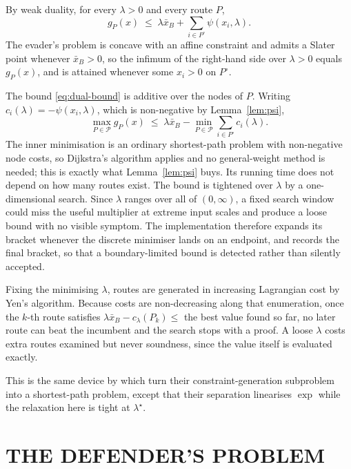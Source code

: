\documentclass[10pt,a4paper,twoside]{article}
\theoremstyle{plain}
\theoremstyle{definition}
\newcommand{\XB}{\bar{x}_B}
\newcommand{\Path}{\mathcal{P}}
\begin{document}
By weak duality, for every $\lambda>0$ and every route $P$,
\begin{equation}
  g_P(x)\;\le\;\lambda\XB+\sum_{i\in P^{\circ}}\psi(x_i,\lambda).
  \label{eq:dual-bound}
\end{equation}
The evader's problem is concave with an affine constraint and admits a
Slater point whenever $\XB>0$, so the infimum of the right-hand side over
$\lambda>0$ equals $g_P(x)$, and is attained whenever some $x_i>0$ on
$P^{\circ}$.

The bound \eqref{eq:dual-bound} is additive over the nodes of $P$. Writing
$c_i(\lambda)=-\psi(x_i,\lambda)$, which is non-negative by
Lemma~\ref{lem:psi},
\begin{equation}
  \max_{P\in\Path} g_P(x)
  \;\le\;
  \lambda\XB-\min_{P\in\Path}\sum_{i\in P^{\circ}}c_i(\lambda).
  \label{eq:sp-bound}
\end{equation}
The inner minimisation is an ordinary shortest-path problem with non-negative
node costs, so Dijkstra's algorithm applies and no general-weight method is
needed; this is exactly what Lemma~\ref{lem:psi} buys. Its running time does
not depend on how many routes exist. The bound is tightened over $\lambda$ by
a one-dimensional search. Since $\lambda$ ranges over all of $(0,\infty)$, a
fixed search window could miss the useful multiplier at extreme input scales
and produce a loose bound with no visible symptom. The implementation
therefore expands its bracket whenever the discrete minimiser lands on an
endpoint, and records the final bracket, so that a boundary-limited bound is
detected rather than silently accepted.

Fixing the minimising $\lambda$, routes are generated in increasing
Lagrangian cost by Yen's algorithm. Because costs are non-decreasing along
that enumeration, once the $k$-th route satisfies
$\lambda\XB-c_\lambda(P_k)\le$ the best value found so far, no later route
can beat the incumbent and the search stops with a proof. A loose $\lambda$
costs extra routes examined but never soundness, since the value itself is
evaluated exactly.

This is the same device by which \citet{nguyen2023} turn their
constraint-generation subproblem into a shortest-path problem, except that
their separation linearises $\exp$ while the relaxation here is tight at
$\lambda^{\star}$.

\section{THE DEFENDER'S PROBLEM}
\label{sec:cutting}
\end{document}
